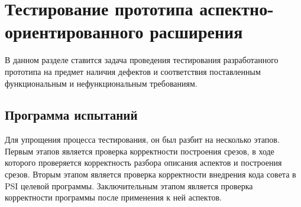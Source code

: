 \chapter{Тестирование прототипа аспектно-ориентированного расширения}
\label{ch:testing}
В данном разделе ставится задача проведения тестирования разработанного прототипа на предмет наличия дефектов и соответствия поставленным функциональным и нефункциональным требованиям.
\section{Программа испытаний}
\label{sec:testing_program}
Для упрощения процесса тестирования, он был разбит на несколько этапов.
Первым этапов является проверка корректности построения срезов, в ходе которого проверяется корректность разбора описания аспектов и построения срезов.
Вторым этапом является проверка корректности внедрения кода совета в PSI целевой программы.
Заключительным этапом является проверка корректности программы после применения к ней аспектов.
